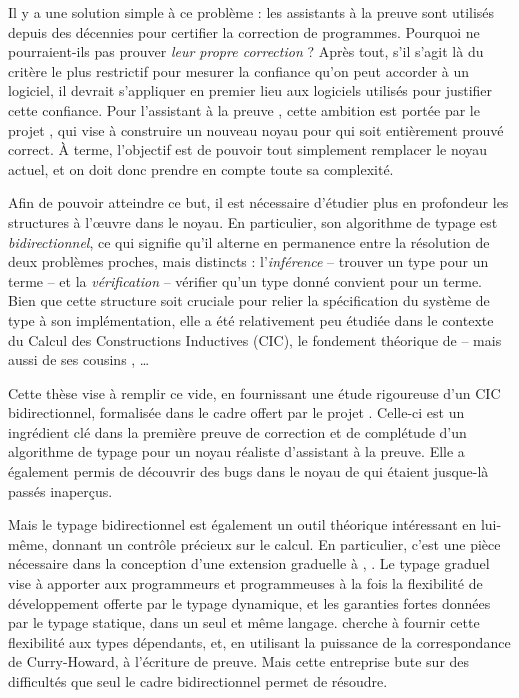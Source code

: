 Il y a une solution simple à ce problème : les assistants à la preuve sont utilisés depuis
des décennies pour certifier la correction de programmes. Pourquoi ne pourraient-ils pas
prouver \emph{leur propre correction} ? Après tout, s’il s’agit là du critère
le plus restrictif pour mesurer la confiance qu’on peut accorder à un logiciel,
il devrait s’appliquer en premier lieu aux logiciels utilisés pour justifier cette
confiance. Pour l’assistant à la preuve , cette ambition est portée par le projet
, qui vise à construire un nouveau noyau pour  qui soit entièrement
prouvé correct. À terme, l’objectif est de pouvoir tout simplement remplacer le noyau actuel,
et on doit donc prendre en compte toute sa complexité.

Afin de pouvoir atteindre ce but, il est nécessaire d’étudier plus en profondeur
les structures à l’œuvre dans le noyau. En particulier, son algorithme de typage est
\emph{bidirectionnel}, ce qui signifie qu’il alterne en permanence entre
la résolution de deux problèmes proches, mais distincts :
l’\emph{inférence} – trouver un type pour un terme – et la \emph{vérification} –
vérifier qu’un type donné convient pour un terme. Bien que cette structure soit cruciale pour
relier la spécification du système de type à son implémentation, elle a été relativement
peu étudiée dans le contexte du Calcul des Constructions Inductives (CIC), le fondement
théorique de  – mais aussi de ses cousins , …

Cette thèse vise à remplir ce vide, en fournissant une étude rigoureuse d’un CIC
bidirectionnel, formalisée dans le cadre offert par le projet . Celle-ci
est un ingrédient clé dans la première preuve de correction et de complétude d’un
algorithme de typage pour un noyau réaliste d’assistant à la preuve.
Elle a également permis de découvrir des bugs dans le noyau de  qui étaient
jusque-là passés inaperçus.

Mais le typage bidirectionnel est également un outil théorique intéressant en lui-même,
donnant un contrôle précieux sur le calcul. En particulier, c’est une pièce nécessaire
dans la conception d’une extension graduelle à , .
Le typage graduel vise à apporter aux programmeurs et programmeuses à la fois la flexibilité
de développement offerte par le typage dynamique, et les garanties fortes données par
le typage statique, dans un seul et même langage.  cherche à fournir cette
flexibilité aux types dépendants, et, en utilisant la
puissance de la correspondance de Curry-Howard, à l’écriture de preuve. Mais cette
entreprise bute sur des difficultés que seul le cadre bidirectionnel permet
de résoudre.

